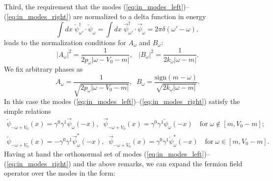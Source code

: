 \documentclass[12pt]{article}
\newcommand\beq{\begin{equation}}
\newcommand\eeq{\end{equation}}
\def\kw{k_{\omega}} \def\pw{p_{\omega}}
\def\psiwR{\overrightarrow{\psi}_{\omega}}
\def\psiwL{\overleftarrow{\psi}_{\omega}}
\def\w{\omega}
\def\sign{\text{sign}}
\numberwithin{equation}{section}
\begin{document}
Third, the requirement that the modes (\ref{eq:in_modes_left})–(\ref{eq:in_modes_right}) are normalized to a delta function in energy
\beq\label{eq:norm_delta_function}
    \int dx\;\overleftarrow{\psi}_{\omega'}^{\dagger}\cdot\psiwL = \int dx\;\overrightarrow{\psi}_{\omega'}^{\dagger}\cdot\psiwR = 2\pi\delta\left(\w'-\w\right),
\eeq
leads to the normalization conditions for $A_{\omega}$ and $B_{\omega}$:
\beq\label{eq:norm_condition}
        \left|A_{\omega}\right|^2 = \frac{1}{2\pw\left|\omega-V_0-m\right|},\;\;\;
        \left|B_{\omega}\right|^2 = \frac{1}{2\kw\left|\omega-m\right|}.
\eeq
We fix arbitrary phases as
\beq\label{eq:norm_coefficients}
    A_{\omega} = \frac{1}{\sqrt{2\pw\left|\omega-V_0-m\right|}},\;\;B_{\omega}= \frac{\sign(m-\w)}{\sqrt{2\kw\left|\omega-m\right|}}.
\eeq
In this case the modes (\ref{eq:in_modes_left})--(\ref{eq:in_modes_right}) satisfy the simple relations
\beq\label{eq:modes_InterRelation}
\begin{aligned}
    \overleftarrow{\psi}_{-\omega+V_0}(x) = \gamma^0\gamma^1\overrightarrow{\psi}_{\omega}(-x), \;\;
    \overrightarrow{\psi}_{-\omega+V_0}(x) = \gamma^0\gamma^1\overleftarrow{\psi}_{\omega}(-x)\quad\text{for}\;\w\notin\left[m,V_0-m\right];
    \\
    \overleftarrow{\psi}_{-\omega+V_0}(x) = -\gamma^0\gamma^1\overrightarrow{\psi}_{\omega}^{*}(-x), \;\;
    \overrightarrow{\psi}_{-\omega+V_0}(x) = \gamma^0\gamma^1\overleftarrow{\psi}_{\omega}^{*}(-x)\quad\text{for}\;\w\in\left[m,V_0-m\right].
\end{aligned}
\eeq
Having at hand the orthonormal set of modes (\ref{eq:in_modes_left})--(\ref{eq:in_modes_right}) and the above remarks, we can expand the fermion field operator over the modes in the form: 
\end{document}

